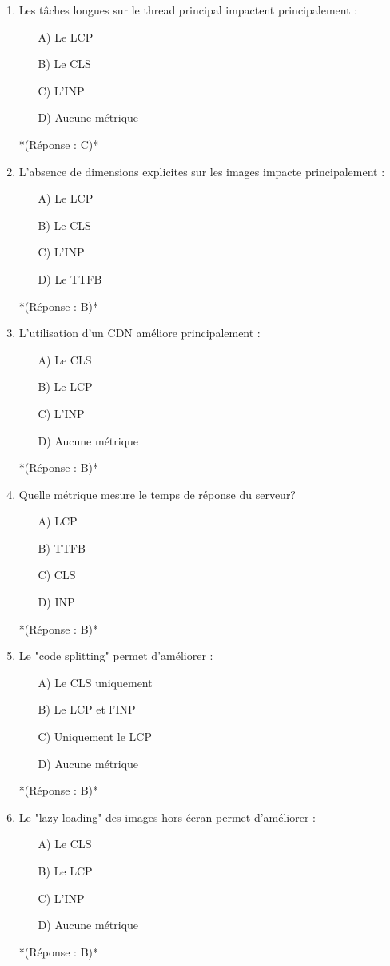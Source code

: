 \documentclass[12pt,a4paper,twoside]{report}
\begin{document}
\begin{enumerate}
\item Les tâches longues sur le thread principal impactent principalement :
\begin{itemize}
\item[A)] Le LCP
\item[B)] Le CLS
\item[C)] L'INP
\item[D)] Aucune métrique
\end{itemize}
*(Réponse : C)*

\item L'absence de dimensions explicites sur les images impacte principalement :
\begin{itemize}
\item[A)] Le LCP
\item[B)] Le CLS
\item[C)] L'INP
\item[D)] Le TTFB
\end{itemize}
*(Réponse : B)*

\item L'utilisation d'un CDN améliore principalement :
\begin{itemize}
\item[A)] Le CLS
\item[B)] Le LCP
\item[C)] L'INP
\item[D)] Aucune métrique
\end{itemize}
*(Réponse : B)*

\item Quelle métrique mesure le temps de réponse du serveur?
\begin{itemize}
\item[A)] LCP
\item[B)] TTFB
\item[C)] CLS
\item[D)] INP
\end{itemize}
*(Réponse : B)*

\item Le "code splitting" permet d'améliorer :
\begin{itemize}
\item[A)] Le CLS uniquement
\item[B)] Le LCP et l'INP
\item[C)] Uniquement le LCP
\item[D)] Aucune métrique
\end{itemize}
*(Réponse : B)*

\item Le "lazy loading" des images hors écran permet d'améliorer :
\begin{itemize}
\item[A)] Le CLS
\item[B)] Le LCP
\item[C)] L'INP
\item[D)] Aucune métrique
\end{itemize}
*(Réponse : B)*


\end{enumerate}
\end{document}

